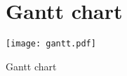 \chapter{Gantt chart}	
\begin{table}
\centering
\texttt{[image: gantt.pdf]} 
\caption{\label{tab:gantt}Gantt chart}
\end{table}